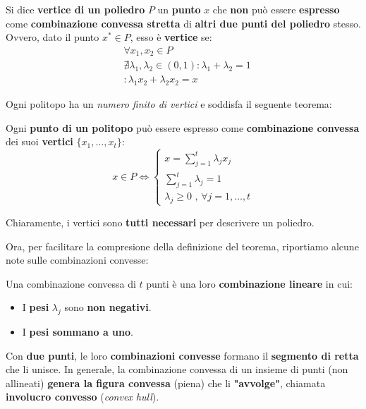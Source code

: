 \begin{definition}[VERTICE]
    Si dice \textbf{vertice di un poliedro} $P$ un \textbf{punto} $x$ che
    \textbf{non} può essere \textbf{espresso} come \textbf{combinazione convessa stretta} 
    di \textbf{altri due punti del poliedro} stesso. Ovvero, dato il punto
    $x^* \in P$, esso è \textbf{vertice} se:
    \[
        \begin{aligned}
            &\forall x_{1},x_{2} \in P \\ 
            &\nexists \lambda_{1},\lambda_{2}\in(0,1) : \lambda_{1}+\lambda_{2} = 1 \\ 
            &: \lambda_{1}x_{2} + \lambda_{2}x_{2} = x
        \end{aligned}
    \] 
\end{definition}

Ogni politopo ha un \textit{numero finito di vertici} e soddisfa il seguente teorema:

\begin{theorem}
    Ogni \textbf{punto di un politopo} può essere espresso come \textbf{combinazione convessa}
    dei suoi \textbf{vertici} $\{x_{1},\ldots ,x_t\}  $:
    \[
        x\in P \Longleftrightarrow \begin{cases}
            x = \sum_{j=1}^t \lambda_j x_j \\ 
            \sum_{j=1}^t \lambda_j = 1 \\ 
            \lambda_j \ge 0 \text{ , }\forall j=1,\ldots,t
        \end{cases}
    \] 
\end{theorem}

Chiaramente, i vertici sono \textbf{tutti necessari} per descrivere un poliedro.

Ora, per facilitare la compresione della definizione del teorema, riportiamo alcune
note sulle combinazioni convesse:

\begin{remark}
    Una combinazione convessa di $t$ punti è una loro \textbf{combinazione lineare} in cui:
    \begin{itemize}
        \item I \textbf{pesi} $\lambda_j$ sono \textbf{non negativi}.
        \item I \textbf{pesi sommano a uno}.
    \end{itemize}

    Con \textbf{due punti}, le loro \textbf{combinazioni convesse} formano il \textbf{segmento 
    di retta} che li unisce. In generale, la combinazione convessa di un insieme di
    punti (non allineati) \textbf{genera la figura convessa} (piena) che li \textbf{"avvolge"},
    chiamata \textbf{involucro convesso} (\textit{convex hull}).
\end{remark}

